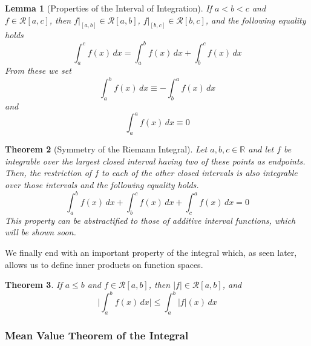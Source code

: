 \documentclass{article}
\newtheorem{theorem}{Theorem}[section]
\newtheorem{lemma}[theorem]{Lemma}
\theoremstyle{remark}
\theoremstyle{definition}
\begin{document}
\begin{lemma}[Properties of the Interval of Integration]
If $a < b < c$ and $f \in \mathcal{R}[a, c]$, then $f \big|_{[a,b]} \in \mathcal{R}[a, b]$, $f \big|_{[b,c]} \in \mathcal{R}[b, c]$, and the following equality holds 
\[\int_a^c f(x)\,dx = \int_a^b f(x)\, dx + \int_b^c f(x)\,dx\]
From these we set
\[\int_a^b f(x)\,dx \equiv - \int_b^a f(x)\,dx\]
and 
\[\int_a^a f(x)\,dx \equiv 0\]
\end{lemma}

\begin{theorem}[Symmetry of the Riemann Integral]
Let $a, b, c \in \mathbb{R}$ and let $f$ be integrable over the largest closed interval having two of these points as endpoints. Then, the restriction of $f$ to each of the other closed intervals is also integrable over those intervals and the following equality holds. 
\[\int_a^b f(x)\,dx + \int_b^c f(x)\,dx + \int_c^a f(x)\,dx = 0\]
This property can be abstractified to those of additive interval functions, which will be shown soon. 
\end{theorem}

We finally end with an important property of the integral which, as seen later, allows us to define inner products on function spaces. 
\begin{theorem}
If $a \leq b$ and $f \in \mathcal{R}[a, b]$, then $|f| \in \mathcal{R}[a, b]$, and 
\[\Bigg| \int_a^b f(x)\,dx \Bigg| \leq \int_a^b |f|(x)\,dx\]
\end{theorem}

\subsubsection{Mean Value Theorem of the Integral}
\end{document}
